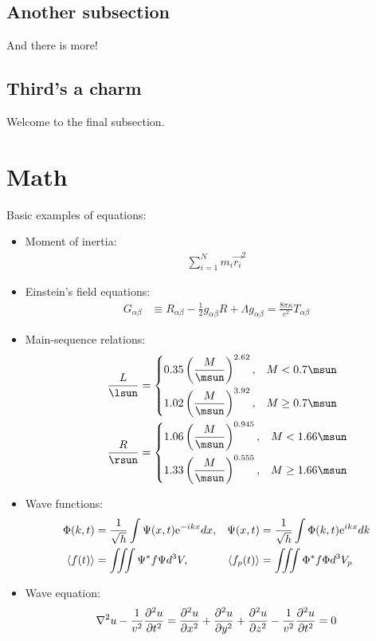 \subsection{Another subsection}
And there is more!
\subsection{Third's a charm}
Welcome to the final subsection.

\section{Math}
\label{sec:math}
\def\ii{\mathrm{i}}
\def\pp{\mathrm{\pi}}

Basic examples of equations:
\begin{itemize}
\item Moment of inertia:
\begin{align}
    \sum_{i=1}^N m_i\vec{r_i}^2
\end{align}
  \item Einstein's field equations:
    \begin{align}
        G_{\alpha\beta} &\equiv R_{\alpha\beta}-\frac{1}{2} g_{\alpha\beta}R+\Lambda g_{\alpha\beta}=\frac{8\pi\kappa}{c^2}T_{\alpha\beta}
    \end{align}
\item Main-sequence relations:
    \begin{align} 
    \qquad \frac{L}{\si\lsun} &= 
    \left\{
    \begin{aligned}
     &0.35\left(\frac{M}{\si\msun}\right)^{2.62}, &M&<0.7\si\msun \\
     &1.02\left(\frac{M}{\si\msun}\right)^{3.92}, &M&\geq 0.7\si\msun
    \end{aligned}
    \right.                                                 \label{eq:mass_light} \\
        \qquad \frac{R}{\si\rsun} &= 
    \left\{
    \begin{aligned}
     &1.06\left(\frac{M}{\si\msun}\right)^{0.945}, &M&<1.66\si\msun \\
     &1.33\left(\frac{M}{\si\msun}\right)^{0.555}, &M&\geq 1.66\si\msun
    \end{aligned}
    \right.                                                 \label{eq:radius_mass} 
    \end{align} 
\item Wave functions:
\begin{align}
\Phi(k,t)&=\frac{1}{\sqrt{h}}\int\Psi(x,t){\rm e}^{-ikx}dx,  
&\Psi(x,t)&=\frac{1}{\sqrt{h}}\int\Phi(k,t){\rm e}^{ikx}dk \\
\langle f(t)\rangle &=\iiint\Psi^* f\Psi d^3V, &\langle f_p(t)\rangle &=\iiint\Phi^*f\Phi d^3V_p
\end{align}
\item Wave equation:
\begin{align}
\nabla^2u-\frac{1}{v^2}\frac{\partial^2 u}{\partial t^2}=\frac{\partial^2 u}{\partial x^2}+\frac{\partial^2 u}{\partial y^2}+\frac{\partial^2 u}{\partial z^2}-\frac{1}{v^2}\frac{\partial^2 u}{\partial t^2}=0
\end{align}


\end{itemize}

